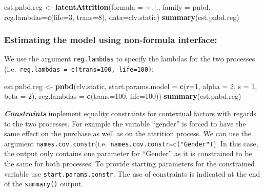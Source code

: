 \documentclass[
]{article}
\newenvironment{Shaded}{\begin{snugshade}}{\end{snugshade}}
\newcommand{\AttributeTok}[1]{\textcolor[rgb]{0.13,0.29,0.53}{#1}}
\newcommand{\DecValTok}[1]{\textcolor[rgb]{0.00,0.00,0.81}{#1}}
\newcommand{\FunctionTok}[1]{\textcolor[rgb]{0.13,0.29,0.53}{\textbf{#1}}}
\newcommand{\NormalTok}[1]{#1}
\newcommand{\OtherTok}[1]{\textcolor[rgb]{0.56,0.35,0.01}{#1}}
\newcommand{\SpecialCharTok}[1]{\textcolor[rgb]{0.81,0.36,0.00}{\textbf{#1}}}
\begin{document}
\begin{Shaded}
\begin{Highlighting}[]
\NormalTok{est.pnbd.reg }\OtherTok{\textless{}{-}} \FunctionTok{latentAttrition}\NormalTok{(}\AttributeTok{formula =} \SpecialCharTok{\textasciitilde{}}\NormalTok{ .}\SpecialCharTok{|}\NormalTok{., }\AttributeTok{family =}\NormalTok{ pnbd, }
                                \AttributeTok{reg.lambdas=}\FunctionTok{c}\NormalTok{(}\AttributeTok{life=}\DecValTok{3}\NormalTok{, }\AttributeTok{trans=}\DecValTok{8}\NormalTok{), }\AttributeTok{data=}\NormalTok{clv.static)}
\FunctionTok{summary}\NormalTok{(est.pnbd.reg)}
\end{Highlighting}
\end{Shaded}

\subsubsection{\texorpdfstring{\textbf{Estimating the model using
non-formula
interface:}}{Estimating the model using non-formula interface:}}\label{estimating-the-model-using-non-formula-interface-4}

We use the argument \texttt{reg.lambdas} to specify the lambdas for the
two processes (i.e.~\texttt{reg.lambdas\ =\ c(trans=100,\ life=100)}:

\begin{Shaded}
\begin{Highlighting}[]
\NormalTok{est.pnbd.reg }\OtherTok{\textless{}{-}} \FunctionTok{pnbd}\NormalTok{(clv.static, }
                         \AttributeTok{start.params.model =} \FunctionTok{c}\NormalTok{(}\AttributeTok{r=}\DecValTok{1}\NormalTok{, }\AttributeTok{alpha =} \DecValTok{2}\NormalTok{, }\AttributeTok{s =} \DecValTok{1}\NormalTok{, }\AttributeTok{beta =} \DecValTok{2}\NormalTok{),}
                         \AttributeTok{reg.lambdas =} \FunctionTok{c}\NormalTok{(}\AttributeTok{trans=}\DecValTok{100}\NormalTok{, }\AttributeTok{life=}\DecValTok{100}\NormalTok{))}
\FunctionTok{summary}\NormalTok{(est.pnbd.reg)}
\end{Highlighting}
\end{Shaded}

\textbf{\emph{Constraints}} implement equality constraints for
contextual factors with regards to the two processes. For example the
variable ``gender'' is forced to have the same effect on the purchase as
well as on the attrition process. We can use the argument
\texttt{names.cov.constr}(i.e.~\texttt{names.cov.constr=c("Gender")}).
In this case, the output only contains one parameter for ``Gender'' as
it is constrained to be the same for both processes. To provide starting
parameters for the constrained variable use
\texttt{start.params.constr}. The use of constraints is indicated at the
end of the \texttt{summary()} output.
\end{document}
